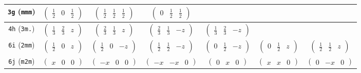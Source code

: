 \documentclass[fleqn,9pt,landscape]{jsarticle}
\begin{document}
\begin{center}
\begin{longtable}{ccccccc}
{\tt 3g} ({\tt mmm}) & $ \begin{pmatrix} \frac{1}{2} & 0 & \frac{1}{2} \end{pmatrix} $ & $ \begin{pmatrix} \frac{1}{2} & \frac{1}{2} & \frac{1}{2} \end{pmatrix} $ & $ \begin{pmatrix} 0 & \frac{1}{2} & \frac{1}{2} \end{pmatrix} $ & $  $ & $  $ & $  $ \\ \hline
{\tt 4h} ({\tt 3m.}) & $ \begin{pmatrix} \frac{1}{3} & \frac{2}{3} & z \end{pmatrix} $ & $ \begin{pmatrix} \frac{2}{3} & \frac{1}{3} & z \end{pmatrix} $ & $ \begin{pmatrix} \frac{2}{3} & \frac{1}{3} & - z \end{pmatrix} $ & $ \begin{pmatrix} \frac{1}{3} & \frac{2}{3} & - z \end{pmatrix} $ & $  $ & $  $ \\ \hline
{\tt 6i} ({\tt 2mm}) & $ \begin{pmatrix} \frac{1}{2} & 0 & z \end{pmatrix} $ & $ \begin{pmatrix} \frac{1}{2} & 0 & - z \end{pmatrix} $ & $ \begin{pmatrix} \frac{1}{2} & \frac{1}{2} & - z \end{pmatrix} $ & $ \begin{pmatrix} 0 & \frac{1}{2} & - z \end{pmatrix} $ & $ \begin{pmatrix} 0 & \frac{1}{2} & z \end{pmatrix} $ & $ \begin{pmatrix} \frac{1}{2} & \frac{1}{2} & z \end{pmatrix} $ \\ \hline
{\tt 6j} ({\tt m2m}) & $ \begin{pmatrix} x & 0 & 0 \end{pmatrix} $ & $ \begin{pmatrix} - x & 0 & 0 \end{pmatrix} $ & $ \begin{pmatrix} - x & - x & 0 \end{pmatrix} $ & $ \begin{pmatrix} 0 & x & 0 \end{pmatrix} $ & $ \begin{pmatrix} x & x & 0 \end{pmatrix} $ & $ \begin{pmatrix} 0 & - x & 0 \end{pmatrix} $ \\ \hline

\end{longtable}
\end{center}
\end{document}
